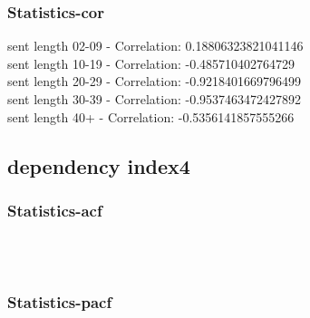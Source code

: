 \documentclass{article}%
\begin{document}
%
\newpage%
\subsubsection{Statistics{-}cor}%
\label{ssubsec:Statistics{-}cor}%
\noindent%
sent length 02-09 - Correlation: 0.18806323821041146\\%
sent length 10-19 - Correlation: -0.485710402764729\\%
sent length 20-29 - Correlation: -0.9218401669796499\\%
sent length 30-39 - Correlation: -0.9537463472427892\\%
sent length 40+ - Correlation: -0.5356141857555266\\

%
\newpage

%
\subsection{dependency index4}%
\label{subsec:dependencyindex4}%
\subsubsection{Statistics{-}acf}%
\label{ssubsec:Statistics{-}acf}%


\begin{figure}[ht]%
\centering%
\setlength{\abovecaptionskip}{-35pt}%
%
%
\\%
%
%
\\%
%
\end{figure}

%
\newpage%
\subsubsection{Statistics{-}pacf}%
\label{ssubsec:Statistics{-}pacf}%
\end{document}
